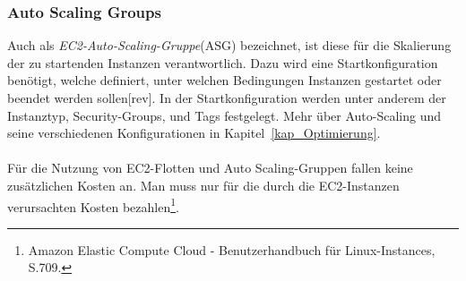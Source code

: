 \subsubsection*{Auto Scaling Groups}%
Auch als \textit{EC2-Auto-Scaling-Gruppe}(ASG) bezeichnet, ist diese für die Skalierung der zu startenden Instanzen verantwortlich. Dazu wird eine Startkonfiguration benötigt, welche definiert, unter welchen Bedingungen Instanzen gestartet oder beendet werden sollen[rev]. In der Startkonfiguration werden unter anderem der Instanztyp, Security-Groups, und Tags festgelegt. Mehr über Auto-Scaling und seine verschiedenen Konfigurationen in Kapitel~\ref{kap_Optimierung}.
\\\\
Für die Nutzung von EC2-Flotten und Auto Scaling-Gruppen fallen keine zusätzlichen Kosten an. Man muss nur für die durch die EC2-Instanzen verursachten Kosten bezahlen\footnote{Amazon Elastic Compute Cloud - Benutzerhandbuch für Linux-Instances, S.709\cite{AMZ26}. }. 

